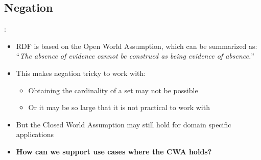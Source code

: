 \documentclass[logoontitle,tabu,supertabular,aspectratio=43]{preney-uwindsor-beamer}
\begin{document}
    \subsection{Negation}
    \begin{frame}{\insertsection: \insertsubsection}
        \begin{itemize}
            \item RDF is based on the Open World Assumption, which can be summarized as: \linebreak
            ``\textit{The absence of evidence cannot be construed as being evidence of absence.}''
            \item This makes negation tricky to work with:
            \begin{itemize}
                \item Obtaining the cardinality of a set may not be possible
                \item Or it may be so large that it is not practical to work with
            \end{itemize}
            \item But the Closed World Assumption may still hold for domain specific applications
            \item \textbf{How can we support use cases where the CWA holds?}
        \end{itemize}
    \end{frame}

\end{document}
